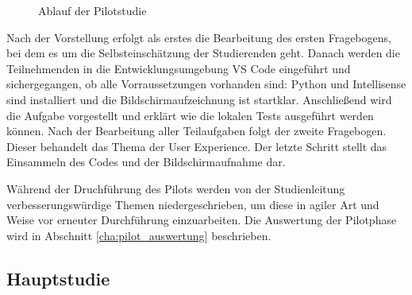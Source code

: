 \begin{figure}[htbp]
  \centering
  \caption{Ablauf der Pilotstudie}
  \label{fig:flow-pilotstudie}
\end{figure}

Nach der Vorstellung erfolgt als erstes die Bearbeitung des ersten Fragebogens, bei dem es um die Selbsteinschätzung der Studierenden geht. Danach werden die Teilnehmenden in die Entwicklungsumgebung VS Code eingeführt und sichergegangen, ob alle Vorraussetzungen vorhanden sind: Python und Intellisense sind installiert und die Bildschirmaufzeichnung ist startklar. Anschließend wird die Aufgabe vorgestellt und erklärt wie die lokalen Tests ausgeführt werden können. Nach der Bearbeitung aller Teilaufgaben folgt der zweite Fragebogen. Dieser behandelt das Thema der User Experience. Der letzte Schritt stellt das Einsammeln des Codes und der Bildschirmaufnahme dar.

Während der Druchführung des Pilots werden von der Studienleitung verbesserungswürdige Themen niedergeschrieben, um diese in agiler Art und Weise vor erneuter Durchführung einzuarbeiten. Die Auswertung der Pilotphase wird in Abschnitt \ref{cha:pilot_auswertung} beschrieben.

\subsection{Hauptstudie}
